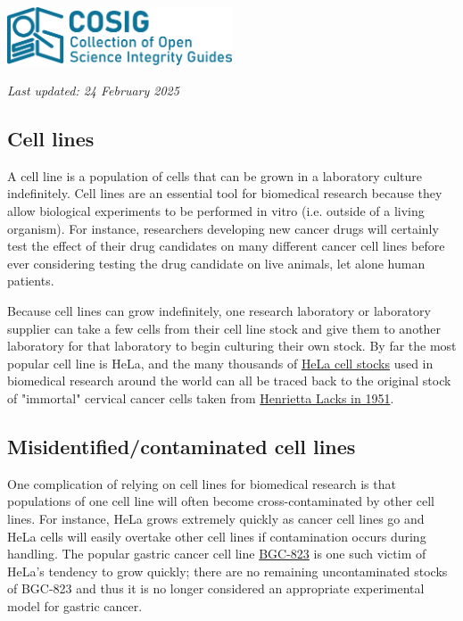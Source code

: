 \documentclass[letterpaper, 12pt]{article}
\begin{document}
\flushleft\includegraphics[width=0.5\textwidth]{img/home/241017_final_logo_mockup.png}

\textit{Last updated: 24 February 2025}

\subsection*{Cell lines}

A cell line is a population of cells that can be grown in a laboratory culture indefinitely. Cell lines are an essential tool for biomedical research because they allow biological experiments to be performed in vitro (i.e. outside of a living organism). For instance, researchers developing new cancer drugs will certainly test the effect of their drug candidates on many different cancer cell lines before ever considering testing the drug candidate on live animals, let alone human patients.

Because cell lines can grow indefinitely, one research laboratory or laboratory supplier can take a few cells from their cell line stock and give them to another laboratory for that laboratory to begin culturing their own stock. By far the most popular cell line is HeLa, and the many thousands of \href{https://www.cellosaurus.org/CVCL_0030}{HeLa cell stocks} used in biomedical research around the world can all be traced back to the original stock of "immortal" cervical cancer cells taken from \href{https://en.wikipedia.org/wiki/Henrietta_Lacks}{Henrietta Lacks in 1951}.

\subsection*{Misidentified/contaminated cell lines}

One complication of relying on cell lines for biomedical research is that populations of one cell line will often become cross-contaminated by other cell lines. For instance, HeLa grows extremely quickly as cancer cell lines go and HeLa cells will easily overtake other cell lines if contamination occurs during handling. The popular gastric cancer cell line \href{https://www.cellosaurus.org/CVCL_3360}{BGC-823} is one such victim of HeLa’s tendency to grow quickly; there are no remaining uncontaminated stocks of BGC-823 and thus it is no longer considered an appropriate experimental model for gastric cancer.
\end{document}
